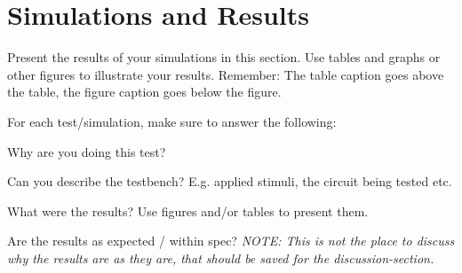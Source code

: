 \section{Simulations and Results}\label{sec:Results}
Present the results of your simulations in this section. Use tables and graphs or other figures to illustrate your results. Remember: The table caption goes above the table, the figure caption goes below the figure.

For each test/simulation, make sure to answer the following: 

\quad Why are you doing this test? 

\quad Can you describe the testbench? E.g. applied stimuli, the circuit being tested etc.

\quad What were the results? Use figures and/or tables to present them. 

\quad Are the results as expected / within spec? \textit{NOTE: This is not the place to discuss why the results are as they are, that should be saved for the discussion-section.}